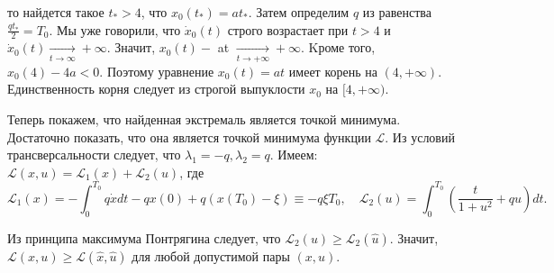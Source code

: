\begin{task}
    то найдется такое $t_*>4$, что $x_0\left(t_*\right)=a t_*$. Затем определим $q$ из равенства $\frac{q t_*}{2}=T_0$.
    Мы уже говорили, что $\dot{x}_0(t)$ строго возрастает при $t>4$ и $\dot{x}_0(t) \underset{t \rightarrow \infty}{\rightarrow}+\infty$. 
    Значит, $x_0(t)-$ at $\underset{t \rightarrow+\infty}{\rightarrow}+\infty$. Kроме того, $x_0(4)-4 a<0$. 
    Поэтому уравнение $x_0(t)=a t$ имеет корень на $(4,+\infty)$. Единственность корня следует из строгой выпуклости $x_0$ на $[4,+\infty)$.

    Теперь покажем, что найденная экстремаль является точкой минимума. Достаточно показать, что она является точкой минимума функции $\mathcal{L}$. 
    Из условий трансверсальности следует, что $\lambda_1=-q, \lambda_2=q$. Имеем: $\mathcal{L}(x, u)=\mathcal{L}_1(x)+\mathcal{L}_2(u)$, где
    $$
    \mathcal{L}_1(x)=-\int_0^{T_0} q \dot{x} d t-q x(0)+q\left(x\left(T_0\right)-\xi\right) \equiv-q \xi T_0, 
    \quad \mathcal{L}_2(u)=\int_0^{T_0}\left(\frac{t}{1+u^2}+q u\right) d t .
    $$

    Из принципа максимума Понтрягина следует, что $\mathcal{L}_2(u) \geq \mathcal{L}_2(\hat{u})$. 
    Значит, $\mathcal{L}(x, u) \geq \mathcal{L}(\hat{x}, \hat{u})$ для любой допустимой пары $(x, u)$.

\end{task}